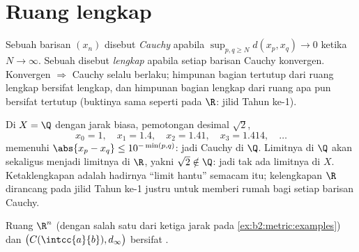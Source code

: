 \section{Ruang lengkap}

\begin{definition}\label{def:b2:metric:complete}
Sebuah barisan $(x_n)$ disebut \emph{Cauchy} apabila $\sup_{p, q \geq N}
d(x_p, x_q) \to 0$ ketika $N \to \infty$. Sebuah  disebut
\emph{lengkap} apabila setiap barisan Cauchy
konvergen. Konvergen $\Rightarrow$ Cauchy selalu berlaku; himpunan bagian
tertutup dari ruang lengkap bersifat lengkap, dan himpunan bagian lengkap
dari ruang apa pun bersifat tertutup (buktinya sama seperti pada $\R$:
jilid Tahun ke-1).
\end{definition}

\begin{example}\label{ex:b2:metric:cauchynolimit}
Di $X = \Q$ dengan jarak biasa, pemotongan desimal
$\sqrt2$,
\[
x_0 = 1,\quad x_1 = 1.4,\quad x_2 = 1.41,\quad x_3 = 1.414,
\quad\dots
\]
memenuhi $\abs{x_p - x_q} \leq 10^{-\min(p,q)}$: jadi Cauchy di $\Q$.
Limitnya di $\Q$ akan sekaligus menjadi limitnya di $\R$, yakni
$\sqrt2 \notin \Q$: jadi tak ada limitnya di $X$. Ketaklengkapan adalah
hadirnya ``limit hantu'' semacam itu; kelengkapan $\R$
dirancang pada jilid Tahun ke-1 justru untuk memberi rumah bagi setiap
barisan Cauchy.
\end{example}

\begin{theorem}\label{thm:b2:metric:rncomplete}
Ruang $\R^n$ (dengan salah satu dari ketiga jarak pada
\cref{ex:b2:metric:examples}) dan $\bigl(C(\intcc{a}{b}),
d_\infty\bigr)$ bersifat .
\end{theorem}


